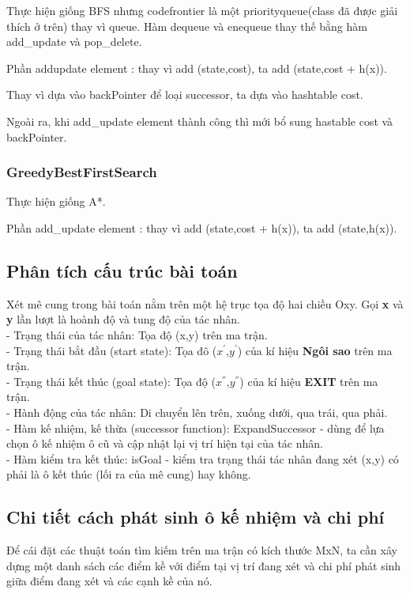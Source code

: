 \documentclass[11pt]{article} %
\begin{document}
Thực hiện giống BFS nhưng code{frontier} là một priorityqueue(class đã được giải thích ở trên) thay vì queue. Hàm dequeue và enequeue thay thế bằng hàm add\_update và pop\_delete.

Phần addupdate element : thay vì add (state,cost), ta add (state,cost + h(x)).

Thay vì dựa vào backPointer để loại successor, ta dựa vào hashtable cost.

Ngoài ra, khi add\_update element thành công thì mới bổ sung hastable cost và backPointer.



\subsubsection{GreedyBestFirstSearch}
Thực hiện giống A*.

Phần add\_update element : thay vì add (state,cost + h(x)), ta add (state,h(x)).
\subsection{Phân tích cấu trúc bài toán}
Xét mê cung trong bài toán nằm trên một hệ trục tọa độ hai chiều Oxy. Gọi \textbf{x} và \textbf{y} lần lượt là hoành độ và tung độ của tác nhân.\\
- Trạng thái của tác nhân: Tọa độ (x,y) trên ma trận.\\
- Trạng thái bắt đầu (start state): Tọa đô ($x^{'}$,$y^{'}$) của kí hiệu \textbf{Ngôi sao} trên ma trận.\\
- Trạng thái kết thúc (goal state): Tọa độ ($x^{''}$,$y^{''}$) của kí hiệu \textbf{EXIT} trên ma trận.\\
- Hành động của tác nhân: Di chuyển lên trên, xuống dưới, qua trái, qua phải.\\
- Hàm kế nhiệm, kế thừa (successor function): ExpandSuccessor - dùng để lựa chọn ô kế nhiệm ô cũ và cập nhật lại vị trí hiện tại của tác nhân.\\
- Hàm kiểm tra kết thúc: isGoal - kiểm tra trạng thái tác nhân đang xét (x,y) có phải là ô kết thúc (lối ra của mê cung) hay không.
\subsection{Chi tiết cách phát sinh ô kế nhiệm và chi phí}
Để cái đặt các thuật toán tìm kiếm trên ma trận có kích thước MxN, ta cần xây dựng một danh sách các điểm kề với điểm tại vị trí đang xét và chi phí phát sinh giữa điểm đang xét và các cạnh kề của nó.\\
\end{document}
